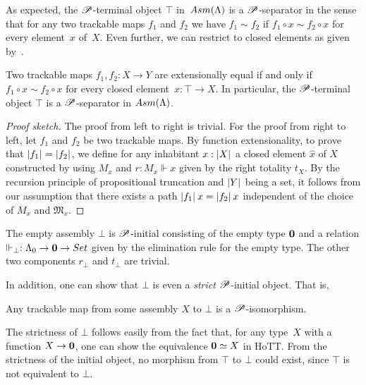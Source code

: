 \documentclass[a4paper,UKenglish,numberwithinsect,cleveref,thm-restate,draft]{lipics-v2021}
\numberwithin{equation}{section}
\theoremstyle{definition}
\theoremstyle{plain}
\begin{document}
As expected, the $\mathscr{P}$-terminal object $\top$ in~$\Asm(\Lambda)$ is a $\mathscr{P}$-separator in the sense that for any two trackable maps $f_1$ and $f_2$ we have $f_1 \sim f_2$ if $f_1 \circ x \sim f_2 \circ x$ for every element~$x$ of~$X$.
Even further, we can restrict to closed elements as given by~.
\begin{proposition}
  Two trackable maps $f_1, f_2\colon X \to Y$ are extensionally equal if and only if $f_1 \circ x \sim f_2 \circ x$ for every closed element~$x\colon \top \to X$.
  In particular, the $\mathscr{P}$-terminal object $\top$ is a $\mathscr{P}$-separator in $\Asm(\Lambda)$.
\end{proposition}
\begin{proof}[Proof sketch]
  The proof from left to right is trivial.
  For the proof from right to left, let $f_1$ and $f_2$ be two trackable maps.
  By function extensionality, to prove that $\mathopen{}\left|f_1\right|_{}^{}\mathclose{} = \mathopen{}\left|f_2\right|_{}^{}\mathclose{}$, we define for any inhabitant $x : \mathopen{}\left|X\right|_{}^{}\mathclose{}$ a closed element $\hat{x}$ of $X$ constructed by  using $M_x$ and $r : M_x \Vdash x$ given by the right totality $t_X$.
  By the recursion principle of propositional truncation and $\mathopen{}\left|Y\right|_{}^{}\mathclose{}$ being a set, it follows from our assumption that there exists a path $\mathopen{}\left|f_1\right|_{}^{}\mathclose{}\,x = \mathopen{}\left|f_2\right|_{}^{}\mathclose{}\, x$ independent of the choice of $M_x$ and $\mathfrak{M}_x$.
\end{proof}

\begin{example}
The empty assembly $\bot$ is $\mathscr{P}$-initial consisting of the empty type $\mathbf{0}$ and a relation $\Vdash_\bot : \Lambda_0 \to \Empty \to \set$ given by the elimination rule for the empty type.
The other two components $r_\bot$ and $t_\bot$ are trivial.
\end{example}

In addition, one can show that $\bot$ is even a \emph{strict} $\mathscr{P}$-initial object. That is, 
\begin{proposition}\label{prop:strict-initial}
  Any trackable map from some assembly $X$ to $\bot$ is a $\mathscr{P}$-isomorphism. 
\end{proposition}
The strictness of $\bot$ follows easily from the fact that, for any type~$X$ with a function $X \to \mathbf{0}$, one can show the equivalence $\mathbf{0} \simeq X$ in HoTT.
From the strictness of the initial object, no morphism from $\top$ to $\bot$ could exist, since $\top$ is not equivalent to $\bot$.
\end{document}
